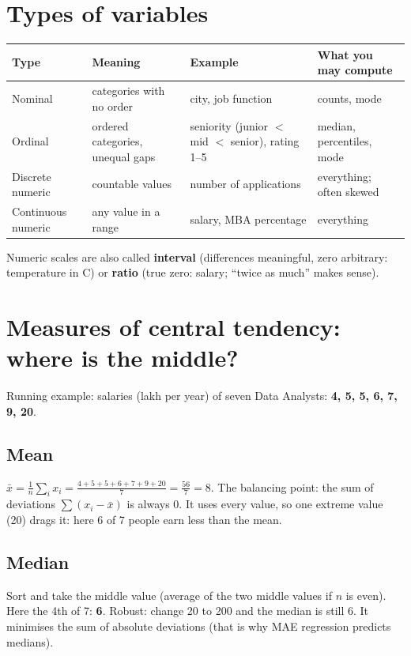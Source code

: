 \section{Types of variables}
\begin{center}\small
\begin{tabularx}{\linewidth}{l X X X}
\toprule
Type & Meaning & Example & What you may compute\\
\midrule
Nominal & categories with no order & city, job function & counts, mode\\
Ordinal & ordered categories, unequal gaps & seniority (junior $<$ mid $<$ senior), rating 1--5 & median, percentiles, mode\\
Discrete numeric & countable values & number of applications & everything; often skewed\\
Continuous numeric & any value in a range & salary, MBA percentage & everything\\
\bottomrule
\end{tabularx}
\end{center}
Numeric scales are also called \textbf{interval} (differences meaningful, zero arbitrary: temperature in \textdegree C) or \textbf{ratio} (true zero: salary;
``twice as much'' makes sense).

\section{Measures of central tendency: where is the middle?}
Running example: salaries (lakh per year) of seven Data Analysts: \textbf{4, 5, 5, 6, 7, 9, 20}.

\subsection{Mean}
$\bar x = \frac1n\sum_ix_i = \frac{4+5+5+6+7+9+20}{7} = \frac{56}{7} = 8$. The balancing point: the sum of deviations $\sum(x_i - \bar x)$ is always 0.
It uses every value, so one extreme value (20) drags it: here 6 of 7 people earn less than the mean.

\subsection{Median}
Sort and take the middle value (average of the two middle values if $n$ is even). Here the 4th of 7: \textbf{6}. Robust: change 20 to 200 and the median
is still 6. It minimises the sum of absolute deviations (that is why MAE regression predicts medians).

